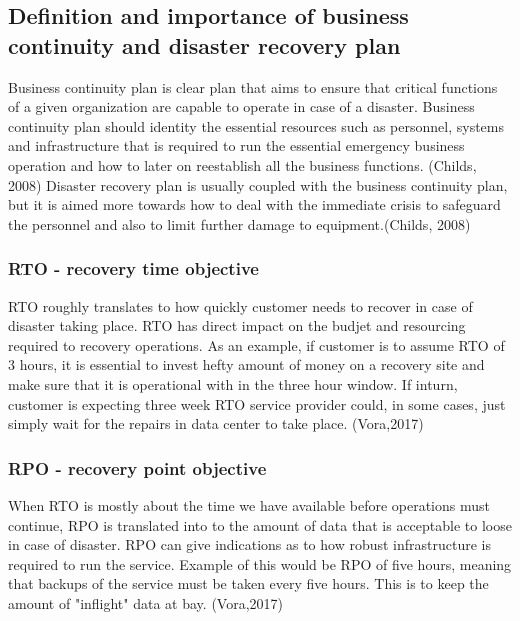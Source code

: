 \documentclass{article}
\begin{document}
\subsection{Definition and importance of business continuity  and disaster recovery plan}
Business continuity plan is clear plan that aims to ensure that critical functions of a given organization are capable to operate in case of a disaster.
Business continuity plan should identity the essential resources such as personnel, systems and infrastructure that is required to run the essential emergency business operation and how to later on reestablish all the business functions. (Childs, 2008)
Disaster recovery plan is usually coupled with the business continuity plan, but it is aimed more towards how to deal with the immediate crisis to safeguard the personnel and also to limit further damage to equipment.(Childs, 2008)
\subsubsection{RTO - recovery time objective}
RTO roughly translates to how quickly customer needs to recover in case of disaster taking place. RTO has direct impact on the budjet and resourcing required to recovery operations. As an example, if customer is to assume RTO of 3 hours, it is essential to invest hefty amount of money on a recovery site and make sure that it is operational with in the three hour window. If inturn, customer is expecting three week RTO service provider could, in some cases, just simply wait for the repairs in data center to take place. (Vora,2017)
\subsubsection{RPO - recovery point objective}
When RTO is mostly about the time we have available before operations must continue, RPO is translated into to the amount of data that is acceptable to loose in case of disaster. RPO can give indications as to how robust infrastructure is required to run the service. Example of this would be RPO of five hours, meaning that backups of the service must be taken every five hours. This is to keep the amount of "inflight" data at bay. (Vora,2017)
\end{document}
